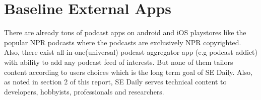 \documentclass{article}
\begin{document}
\section{Baseline External Apps}
There are already tons of podcast apps on android and iOS playstores like the popular NPR podcasts where the podcasts are exclusively NPR copyrighted. Also, there exist all-in-one(universal) podcast aggregator app (e.g podcast addict) with ability to add any podcast feed of interests. But none of them tailors content according to users choices which is the long term goal of SE Daily. Also, as noted in section 2 of this report, SE Daily serves technical content to developers, hobbyists, professionals and researchers.
\end{document}
